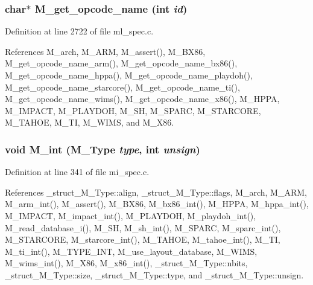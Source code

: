 \subsubsection{\setlength{\rightskip}{0pt plus 5cm}char$\ast$ M\_\-get\_\-opcode\_\-name (int {\em id})}\label{m__spec_8h_89251420cce2259431ea72eb5826a914}




Definition at line 2722 of file ml\_\-spec.c.

References M\_\-arch, M\_\-ARM, M\_\-assert(), M\_\-BX86, M\_\-get\_\-opcode\_\-name\_\-arm(), M\_\-get\_\-opcode\_\-name\_\-bx86(), M\_\-get\_\-opcode\_\-name\_\-hppa(), M\_\-get\_\-opcode\_\-name\_\-playdoh(), M\_\-get\_\-opcode\_\-name\_\-starcore(), M\_\-get\_\-opcode\_\-name\_\-ti(), M\_\-get\_\-opcode\_\-name\_\-wims(), M\_\-get\_\-opcode\_\-name\_\-x86(), M\_\-HPPA, M\_\-IMPACT, M\_\-PLAYDOH, M\_\-SH, M\_\-SPARC, M\_\-STARCORE, M\_\-TAHOE, M\_\-TI, M\_\-WIMS, and M\_\-X86.
\subsubsection{\setlength{\rightskip}{0pt plus 5cm}void M\_\-int (\bf{M\_\-Type} {\em type}, int {\em unsign})}\label{m__spec_8h_c766b8ecea5e1faf092ce72af07e9af4}




Definition at line 341 of file mi\_\-spec.c.

References \_\-struct\_\-M\_\-Type::align, \_\-struct\_\-M\_\-Type::flags, M\_\-arch, M\_\-ARM, M\_\-arm\_\-int(), M\_\-assert(), M\_\-BX86, M\_\-bx86\_\-int(), M\_\-HPPA, M\_\-hppa\_\-int(), M\_\-IMPACT, M\_\-impact\_\-int(), M\_\-PLAYDOH, M\_\-playdoh\_\-int(), M\_\-read\_\-database\_\-i(), M\_\-SH, M\_\-sh\_\-int(), M\_\-SPARC, M\_\-sparc\_\-int(), M\_\-STARCORE, M\_\-starcore\_\-int(), M\_\-TAHOE, M\_\-tahoe\_\-int(), M\_\-TI, M\_\-ti\_\-int(), M\_\-TYPE\_\-INT, M\_\-use\_\-layout\_\-database, M\_\-WIMS, M\_\-wims\_\-int(), M\_\-X86, M\_\-x86\_\-int(), \_\-struct\_\-M\_\-Type::nbits, \_\-struct\_\-M\_\-Type::size, \_\-struct\_\-M\_\-Type::type, and \_\-struct\_\-M\_\-Type::unsign.

